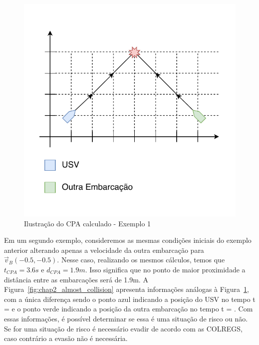         \begin{figure}[H]
            \centering
            \includegraphics{fig/chap2/cpa_explanation_collision.pdf}
            \caption{Ilustração do CPA calculado - Exemplo 1}
            \label{fig:chap2_collision}
        \end{figure}
        
        Em um segundo exemplo, consideremos as mesmas condições iniciais do exemplo anterior alterando apenas a velocidade da outra embarcação para $\vec{v}_{B}(-0.5,-0.5)$. Nesse caso, realizando os mesmos cálculos, temos que $t_{CPA} = 3.6s$ e $d_{CPA} = 1.9m$. Isso significa que no ponto de maior proximidade a distância entre as embarcações será de 1.9m. A Figura~\ref{fig:chap2_almost_collision} apresenta informações 
        análogas à Figura~\ref{fig:chap2_collision}, com a única diferença sendo o ponto azul indicando a posição do USV no tempo t = \tcpa e o ponto verde indicando a posição da outra embarcação no tempo t = \tcpa. Com essas informações, é possível determinar se essa é uma 
        situação de risco ou não. Se for uma situação de risco é necessário evadir de acordo com as COLREGS, caso contrário a evasão não é necessária.
        
